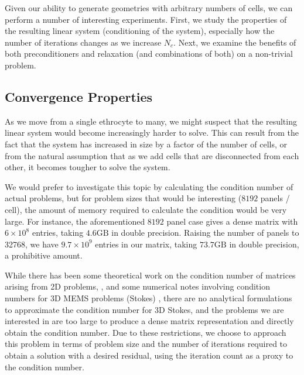 Given our ability to generate geometries with arbitrary numbers of cells, we can perform a number of interesting experiments. First, we study the properties of the resulting linear system (conditioning of the system), especially how the number of iterations changes as we increase $N_c$. Next, we examine the benefits of both preconditioners and relaxation (and combinations of both) on a non-trivial problem.

\subsection{Convergence Properties}\label{sec:convergence_properties}

As we move from a single ethrocyte to many, we might suspect that the resulting linear system would become increasingly harder to solve. This can result from the fact that the system has increased in size by a factor of the number of cells, or from the natural assumption that as we add cells that are disconnected from each other, it becomes tougher to solve the system.

We would prefer to investigate this topic by calculating the condition number of actual problems, but for problem sizes that would be interesting ($8192$ panels / cell), the amount of memory required to calculate the condition would be very large. For instance, the aforementioned $8192$ panel case gives a dense matrix with $6\times 10^{8}$ entries, taking $4.6\text{GB}$ in double precision. Raising the number of panels to 32768, we have $9.7\times10^{9}$ entries in our matrix, taking $73.7\text{GB}$ in double precision, a prohibitive amount. 

While there has been some theoretical work on the condition number of matrices arising from 2D {\bem} problems, \cite{DijkstraMattheij06,dijkstramattheij2007}, and some numerical notes involving condition numbers for 3D MEMS problems (Stokes) \cite{frangi2005}, there are no analytical formulations to approximate the condition number for 3D Stokes, and the problems we are interested in are too large to produce a dense matrix representation and directly obtain the condition number. Due to these restrictions, we choose to approach this problem in terms of problem size and the number of iterations required to obtain a solution with a desired residual, using the iteration count as a proxy to the condition number.

